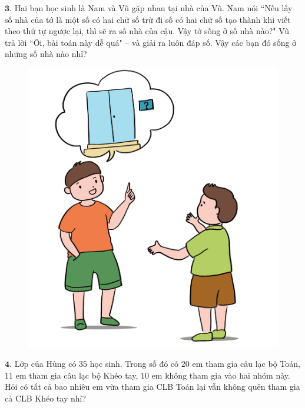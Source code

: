 \begin{multicols}{2}
\begin{figure}[H]
		\vspace*{-15pt}
	\end{figure}
	$\pmb{3.}$ Hai bạn học sinh là Nam và Vũ gặp nhau tại nhà của Vũ. Nam nói ``Nếu lấy số nhà của tớ là một số có hai chữ số trừ đi số có hai chữ số tạo thành khi viết theo thứ tự ngược lại, thì sẽ ra số nhà của cậu. Vậy tớ sống ở số nhà nào?"
	\vskip 0.1cm
	Vũ trả lời ``Ôi, bài toán này dễ quá" -- và giải ra luôn đáp số.
	\vskip 0.1cm
	Vậy các bạn đó sống ở những số nhà nào nhỉ?
	\begin{figure}[H]
		\centering
		\vspace*{-5pt}
		\captionsetup{labelformat= empty, justification=centering}
		\includegraphics[width=1\linewidth]{Pi10_ToanBi_Bai3}
		\vspace*{-15pt}
	\end{figure}
	$\pmb{4.}$ Lớp của Hùng có $35$ học sinh. Trong số đó có $20$ em tham gia câu lạc bộ Toán, 11 em tham gia câu lạc bộ Khéo tay, $10$ em không tham gia vào hai nhóm này. Hỏi có tất cả bao nhiêu em vừa tham gia CLB Toán lại vẫn không quên tham gia cả CLB Khéo tay nhỉ?
	\begin{figure}[H]
		\centering
		\vspace*{-5pt}
		\captionsetup{labelformat= empty, justification=centering}

\end{figure}
\end{multicols}
